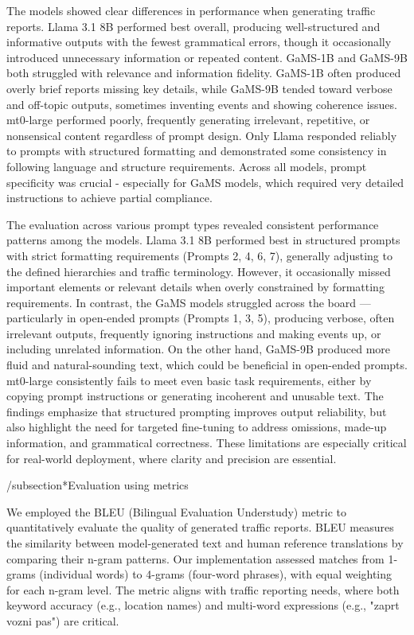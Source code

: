 The models showed clear differences in performance when generating traffic reports. Llama 3.1 8B performed best overall, producing well-structured and informative outputs with the fewest grammatical errors, though it occasionally introduced unnecessary information or repeated content. GaMS-1B and GaMS-9B both struggled with relevance and information fidelity. GaMS-1B often produced overly brief reports missing key details, while GaMS-9B tended toward verbose and off-topic outputs, sometimes inventing events and showing coherence issues. mt0-large performed poorly, frequently generating irrelevant, repetitive, or nonsensical content regardless of prompt design. Only Llama responded reliably to prompts with structured formatting and demonstrated some consistency in following language and structure requirements. Across all models, prompt specificity was crucial - especially for GaMS models, which required very detailed instructions to achieve partial compliance.

The evaluation across various prompt types revealed consistent performance patterns among the models. Llama 3.1 8B performed best in structured prompts with strict formatting requirements (Prompts 2, 4, 6, 7), generally adjusting to the defined hierarchies and traffic terminology. However, it occasionally missed important elements or relevant details when overly constrained by formatting requirements. In contrast, the GaMS models struggled across the board — particularly in open-ended prompts (Prompts 1, 3, 5), producing verbose, often irrelevant outputs, frequently ignoring instructions and making events up, or including unrelated information. On the other hand, GaMS-9B produced more fluid and natural-sounding text, which could be beneficial in open-ended prompts. mt0-large consistently fails to meet even basic task requirements, either by copying prompt instructions or generating incoherent and unusable text. The findings emphasize that structured prompting improves output reliability, but also highlight the need for targeted fine-tuning to address omissions, made-up information, and grammatical correctness. These limitations are especially critical for real-world deployment, where clarity and precision are essential.

/subsection*{Evaluation using metrics}

We employed the BLEU (Bilingual Evaluation Understudy) metric to quantitatively evaluate the quality of generated traffic reports. BLEU measures the similarity between model-generated text and human reference translations by comparing their n-gram patterns. Our implementation assessed matches from 1-grams (individual words) to 4-grams (four-word phrases), with equal weighting for each n-gram level. The metric aligns with traffic reporting needs, where both keyword accuracy (e.g., location names) and multi-word expressions (e.g., "zaprt vozni pas") are critical.


